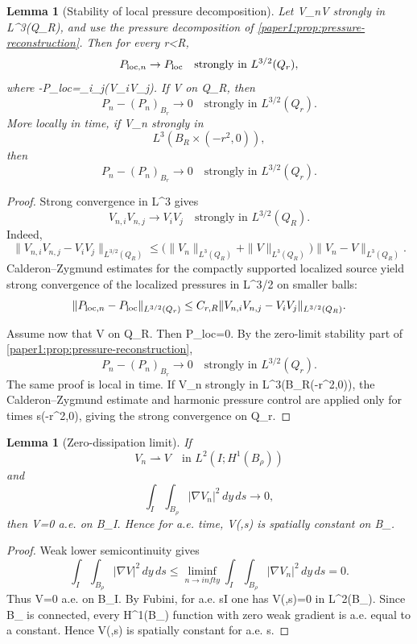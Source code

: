 \documentclass[11pt]{amsart}
\def\({}%
\def\){}%
\def\infty{infty}%
\theoremstyle{plain}
\newtheorem{lemma}[theorem]{Lemma}
\theoremstyle{definition}
\theoremstyle{remark}
\begin{document}
\begin{lemma}[Stability of local pressure decomposition]\label{paper1:lem:pressure-stability}
Let \(V_n\to V\) strongly in \(L^3(Q_R)\), and use the pressure decomposition
of \cref{paper1:prop:pressure-reconstruction}.  Then for every \(r<R\),
\[
  P_{{\rm loc},n}\to P_{\rm loc}
  \quad\text{strongly in }L^{3/2}(Q_r),
\]
where \(-\Delta P_{\rm loc}=\partial_i\partial_j(\zeta V_iV_j)\).  If
\(V\) on \(Q_R\), then
\[
  P_n-(P_n)_{B_r}\to0
  \quad\text{strongly in }L^{3/2}(Q_r).
\]
More locally in time, if \(V_n\) strongly in
\[
  L^3(B_R\times(-r^2,0)),
\]
then
\[
  P_n-(P_n)_{B_r}\to0
  \quad\text{strongly in }L^{3/2}(Q_r).
\]
\end{lemma}

\begin{proof}
Strong convergence in \(L^3\) gives
\[
  V_{n,i}V_{n,j}\to V_iV_j
  \quad\text{strongly in }L^{3/2}(Q_R).
\]
Indeed,
\[
  \|V_{n,i}V_{n,j}-V_iV_j\|_{L^{3/2}(Q_R)}
  \le
  \bigl(\|V_n\|_{L^3(Q_R)}+\|V\|_{L^3(Q_R)}\bigr)
  \|V_n-V\|_{L^3(Q_R)}.
\]
Calderon--Zygmund estimates for the compactly supported localized source yield
strong convergence of the localized pressures in \(L^{3/2}\) on smaller balls:
\[
  \|P_{{\rm loc},n}-P_{\rm loc}\|_{L^{3/2}(Q_r)}
  \le
  C_{r,R}
  \|V_{n,i}V_{n,j}-V_iV_j\|_{L^{3/2}(Q_R)}.
\]

Assume now that \(V\) on \(Q_R\).  Then \(P_{\rm loc}=0\).  By the
zero-limit stability part of \cref{paper1:prop:pressure-reconstruction},
\[
  P_n-(P_n)_{B_r}\to0
  \quad\text{strongly in }L^{3/2}(Q_r).
\]
The same proof is local in time.  If \(V_n\) strongly in
\(L^3(B_R\times(-r^2,0))\), the Calderon--Zygmund estimate and harmonic
pressure control are applied only for times \(s\in(-r^2,0)\), giving the
strong convergence on \(Q_r\).
\end{proof}

\begin{lemma}[Zero-dissipation limit]\label{paper1:lem:zero-dissipation}
If
\[
  V_n\rightharpoonup V\quad\text{in }L^2(I;H^1(B_\rho))
\]
and
\[
  \int_I\int_{B_\rho}|\nabla V_n|^2\,dy\,ds\to0,
\]
then \(\nabla V=0\) a.e. on \(B_\rho\times I\).  Hence for a.e. time,
\(V(\cdot,s)\) is spatially constant on \(B_\rho\).
\end{lemma}

\begin{proof}
Weak lower semicontinuity gives
\[
  \int_I\int_{B_\rho}|\nabla V|^2\,dy\,ds
  \le \liminf_{n\to\infty}\int_I\int_{B_\rho}|\nabla V_n|^2\,dy\,ds=0.
\]
Thus \(\nabla V=0\) a.e. on \(B_\rho\times I\).  By Fubini, for a.e.
\(s\in I\) one has \(\nabla V(\cdot,s)=0\) in \(L^2(B_\rho)\).  Since
\(B_\rho\) is connected, every \(H^1(B_\rho)\) function with zero weak
gradient is a.e. equal to a constant.  Hence \(V(\cdot,s)\) is spatially
constant for a.e. \(s\).
\end{proof}
\end{document}
